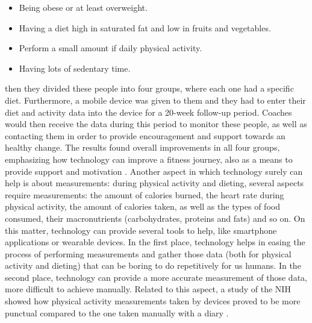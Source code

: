 \begin{itemize}[nosep] %
    \item Being obese or at least overweight.
    \item Having a diet high in saturated fat and low in fruits and vegetables.
    \item Perform a small amount if daily physical activity.
    \item Having lots of sedentary time.
\end{itemize}
then they divided these people into four groups, where each one had a specific diet. Furthermore, a mobile device was given to them and they had to enter their diet and activity data into the device for a 20-week follow-up period. Coaches would then receive the data during this period to monitor these people, as well as contacting them in order to provide encouragement and support towards an healthy change. The results found overall improvements in all four groups, emphasizing how technology can improve a fitness journey, also as a means to provide support and motivation \cite{NihMobileStudies}. \newline Another aspect in which technology surely can help is about measurements: during physical activity and dieting, several aspects require measurements: the amount of calories burned, the heart rate during physical activity, the amount of calories taken, as well as the types of food consumed, their macronutrients (carbohydrates, proteins and fats) and so on. On this matter, technology can provide several tools to help, like smartphone applications or wearable devices. \newline In the first place, technology helps in easing the process of performing measurements and gather those data (both for physical activity and dieting) that can be boring to do repetitively for us humans. In the second place, technology can provide a more accurate measurement of those data, more difficult to achieve manually. Related to this aspect, a study of the NIH showed how physical activity measurements taken by devices proved to be more punctual compared to the one taken manually with a diary \cite{NihDeviceMeasurements}.%
